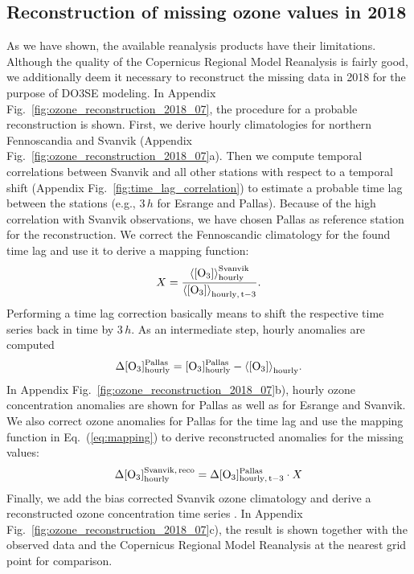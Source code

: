 \documentclass[bg, manuscript]{copernicus}
\begin{document}
\subsection{Reconstruction of missing ozone values in 2018}
\label{subsec:ozone_reco}
As we have shown, the available reanalysis products have their limitations. Although the quality of the Copernicus Regional Model Reanalysis is fairly good, we additionally deem it necessary to reconstruct the missing data in 2018 for the purpose of DO3SE modeling. In Appendix Fig.~\ref{fig:ozone_reconstruction_2018_07}, the procedure for a probable reconstruction is shown. First, we derive hourly climatologies for northern Fennoscandia  and Svanvik  (Appendix Fig.~\ref{fig:ozone_reconstruction_2018_07}a). Then we compute temporal correlations between Svanvik and all other stations with respect to a temporal shift (Appendix Fig.~\ref{fig:time_lag_correlation}) to estimate a probable time lag between the stations (e.g., $3\,\unit{h}$ for Esrange and Pallas). Because of the high correlation with Svanvik observations, we have chosen Pallas as reference station for the reconstruction. We correct the Fennoscandic climatology for the found time lag and use it to derive a mapping function:
\begin{equation}
  X = \frac{\chem{\left<[O_3]\right>_{hourly}^{Svanvik}}}{\chem{\left<[O_3]\right>_{hourly,\,t-3}}}.
  \label{eq:mapping}
\end{equation}
Performing a time lag correction basically means to shift the respective time series back in time by $3\,\unit{h}$.
As an intermediate step, hourly anomalies are computed
\begin{equation}
  \chem{\Delta[O_3]_{hourly}^{Pallas}} = \chem{[O_3]_{hourly}^{Pallas}}-\chem{\left<[O_3]\right>_{hourly}}.
\end{equation}
In Appendix Fig.~\ref{fig:ozone_reconstruction_2018_07}b), hourly ozone concentration anomalies are shown for Pallas as well as for Esrange and Svanvik. We also correct ozone anomalies for Pallas for the time lag  and use the mapping function in Eq.~(\ref{eq:mapping}) to derive reconstructed anomalies for the missing values:
\begin{equation}
    \chem{\Delta [O_3]_{hourly}^{Svanvik,\,reco}} = \chem{\Delta[O_3]_{hourly,\,t-3}^{Pallas}} \cdot X
\end{equation}
Finally, we add the bias corrected Svanvik ozone climatology and derive a reconstructed ozone concentration time series . In Appendix Fig.~\ref{fig:ozone_reconstruction_2018_07}c), the result is shown together with the observed data and the Copernicus Regional Model Reanalysis at the nearest grid point for comparison.
\end{document}
